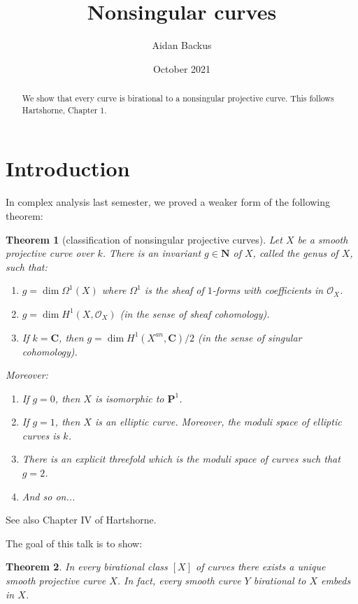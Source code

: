 \documentclass[reqno,12pt,letterpaper]{amsart}
\title{Nonsingular curves}
\author{Aidan Backus}
\date{October 2021}
\newcommand{\NN}{\mathbf{N}}
\newcommand{\CC}{\mathbf{C}}
\newcommand{\PP}{\mathbf P}
\newcommand{\Olo}{\mathscr O}
\newtheorem{theorem}{Theorem}[section]
\theoremstyle{definition}
\begin{document}
\begin{abstract}
We show that every curve is birational to a nonsingular projective curve.
This follows Hartshorne, Chapter 1.
\end{abstract}

\maketitle


\section{Introduction}
In complex analysis last semester, we proved a weaker form of the following theorem:

\begin{theorem}[classification of nonsingular projective curves]
Let $X$ be a smooth projective curve over $k$.
There is an invariant $g \in \NN$ of $X$, called the \emph{genus} of $X$, such that:
\begin{enumerate}
\item $g = \dim \Omega^1(X)$ where $\Omega^1$ is the sheaf of $1$-forms with coefficients in $\Olo_X$.
\item $g = \dim H^1(X, \Olo_X)$ (in the sense of sheaf cohomology).
\item If $k = \CC$, then $g = \dim H^1(X^{an}, \CC)/2$ (in the sense of singular cohomology).
\end{enumerate}
Moreover:
\begin{enumerate}
\item If $g = 0$, then $X$ is isomorphic to $\PP^1$.
\item If $g = 1$, then $X$ is an elliptic curve. Moreover, the moduli space of elliptic curves is $k$.
\item There is an explicit threefold which is the moduli space of curves such that $g = 2$.
\item And so on...
\end{enumerate}
\end{theorem}

See also Chapter IV of Hartshorne.

The goal of this talk is to show:

\begin{theorem}
In every birational class $[X]$ of curves there exists a unique smooth projective curve $X$.
In fact, every smooth curve $Y$ birational to $X$ embeds in $X$.
\end{theorem}
\end{document}
